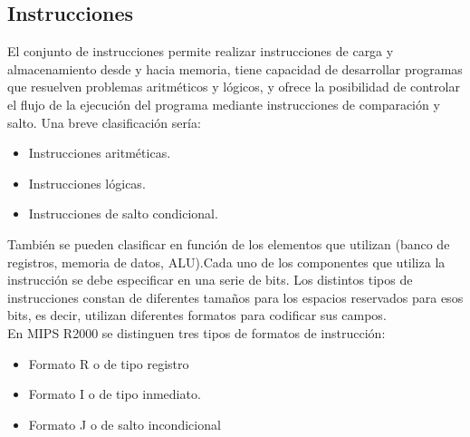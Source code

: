 \documentclass[12pt]{article}
\begin{document}
\subsection{Instrucciones}
El conjunto de instrucciones permite realizar instrucciones de carga y almacenamiento
desde y hacia memoria, tiene capacidad de desarrollar programas que resuelven problemas aritméticos y lógicos, y ofrece la posibilidad de controlar el flujo de la ejecución del programa mediante instrucciones de comparación y salto.
Una breve clasificación sería:
\begin{itemize}
\item Instrucciones aritméticas.
\item Instrucciones lógicas.
\item Instrucciones de salto condicional.
\end{itemize}
También se pueden clasificar en función de los elementos que utilizan (banco de registros, memoria de datos, ALU).Cada uno de los componentes que utiliza la instrucción se debe especificar en una serie de bits. Los distintos tipos de instrucciones
constan de diferentes tamaños para los espacios reservados para esos bits, es decir, utilizan diferentes formatos para codificar sus campos.\\
En MIPS R2000 se distinguen tres tipos de formatos de instrucción:
\begin{itemize}
\item Formato R o de tipo registro
\item Formato I o de tipo inmediato.
\item Formato J o de salto incondicional
\end{itemize}

\end{document}
